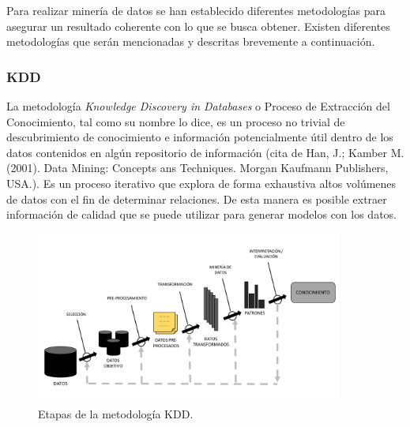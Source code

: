 
Para realizar minería de datos se han establecido diferentes metodologías para asegurar un resultado coherente con lo que se busca obtener. Existen diferentes metodologías que serán mencionadas y descritas brevemente a continuación.

\subsubsection{KDD}


La metodología \textit{Knowledge Discovery in Databases} o Proceso de Extracción del Conocimiento, tal como su nombre lo dice, es un proceso no trivial de descubrimiento de conocimiento e información potencialmente útil dentro de los datos contenidos en algún repositorio de información (cita de Han, J.; Kamber M. (2001). Data Mining: Concepts ans Techniques. Morgan Kaufmann Publishers, USA.). 
Es un proceso iterativo que explora de forma exhaustiva altos volúmenes de datos con el fin de determinar relaciones. De esta manera es posible extraer información de calidad que se puede utilizar para generar modelos con los datos.

\begin{figure}[H]
  \centering
    \includegraphics[width=0.9\textwidth]{Figuras/KDD}
      \caption{Etapas de la metodología KDD.}
    \label{fig:kdd}
\end{figure}

